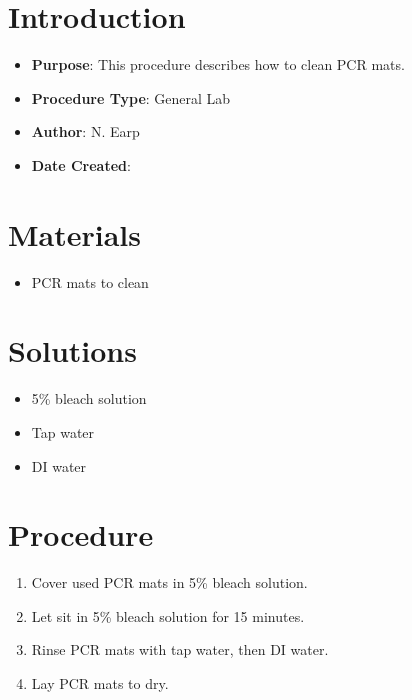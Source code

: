 \documentclass[
  letterpaper,
  DIV=11,
  numbers=noendperiod]{scrreprt}
\providecommand{\tightlist}{%
  \setlength{\itemsep}{0pt}\setlength{\parskip}{0pt}}\usepackage{longtable,booktabs,array}
\begin{document}
\hypertarget{introduction-1}{%
\section{Introduction}\label{introduction-1}}

\begin{itemize}
\tightlist
\item
  \textbf{Purpose}: This procedure describes how to clean PCR mats.
\item
  \textbf{Procedure Type}: General Lab
\item
  \textbf{Author}: N. Earp
\item
  \textbf{Date Created}:
\end{itemize}

\hypertarget{materials-1}{%
\section{Materials}\label{materials-1}}

\begin{itemize}
\tightlist
\item
  PCR mats to clean
\end{itemize}

\hypertarget{solutions-1}{%
\section{Solutions}\label{solutions-1}}

\begin{itemize}
\tightlist
\item
  5\% bleach solution
\item
  Tap water
\item
  DI water
\end{itemize}

\hypertarget{procedure-1}{%
\section{Procedure}\label{procedure-1}}

\begin{enumerate}
\def\labelenumi{\arabic{enumi}.}
\tightlist
\item
  Cover used PCR mats in 5\% bleach solution.
\item
  Let sit in 5\% bleach solution for 15 minutes.
\item
  Rinse PCR mats with tap water, then DI water.
\item
  Lay PCR mats to dry.
\end{enumerate}
\end{document}
